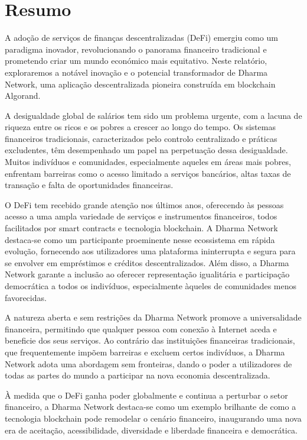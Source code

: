 \chapter*{Resumo}

A adoção de serviços de finanças descentralizadas (DeFi) emergiu como um paradigma inovador, revolucionando o panorama financeiro tradicional e prometendo criar um mundo económico mais equitativo. Neste relatório, exploraremos a notável inovação e o potencial transformador de Dharma Network, uma aplicação descentralizada pioneira construída em blockchain Algorand.\newline

A desigualdade global de salários tem sido um problema urgente, com a lacuna de riqueza entre os ricos e os pobres a crescer ao longo do tempo. Os sistemas financeiros tradicionais, caracterizados pelo controlo centralizado e práticas excludentes, têm desempenhado um papel na perpetuação dessa desigualdade. Muitos indivíduos e comunidades, especialmente aqueles em áreas mais pobres, enfrentam barreiras como o acesso limitado a serviços bancários, altas taxas de transação e falta de oportunidades financeiras.\newline

O DeFi tem recebido grande atenção nos últimos anos, oferecendo às pessoas acesso a uma ampla variedade de serviços e instrumentos financeiros, todos facilitados por smart contracts e tecnologia blockchain. A Dharma Network destaca-se como um participante proeminente nesse ecossistema em rápida evolução, fornecendo aos utilizadores uma plataforma ininterrupta e segura para se envolver em empréstimos e créditos descentralizados. Além disso, a Dharma Network garante a inclusão ao oferecer representação igualitária e participação democrática a todos os indivíduos, especialmente àqueles de comunidades menos favorecidas.\newline

A natureza aberta e sem restrições da Dharma Network promove a universalidade financeira, permitindo que qualquer pessoa com conexão à Internet aceda e beneficie dos seus serviços. Ao contrário das instituições financeiras tradicionais, que frequentemente impõem barreiras e excluem certos indivíduos, a Dharma Network adota uma abordagem sem fronteiras, dando o poder a utilizadores de todas as partes do mundo a participar na nova economia descentralizada.\newline

À medida que o DeFi ganha poder globalmente e continua a perturbar o setor financeiro, a Dharma Network destaca-se como um exemplo brilhante de como a tecnologia blockchain pode remodelar o cenário financeiro, inaugurando uma nova era de aceitação, acessibilidade, diversidade e liberdade financeira e democrática.


\vspace*{2cm}


